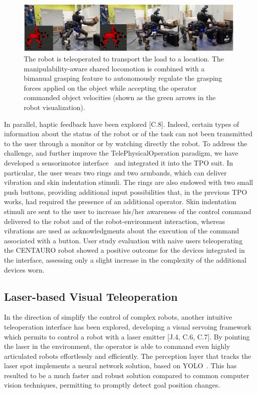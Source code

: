 \begin{figure}[H]
	\centering
	\includegraphics[width=0.9\linewidth]{img/tpoexpbox}
	\caption{The robot is teleoperated to transport the load to a location. The manipulability-aware shared locomotion is combined with a bimanual grasping feature to autonomously regulate the grasping forces applied on the object while accepting the operator commanded object velocities (shown as the green arrows in the robot visualization).}
	\label{fig:tpoexpbox}
\end{figure}

In parallel, haptic feedback have been explored [C.8]. Indeed, certain types of information about the status of the robot or of the task can not been transmitted to the user through a monitor or by watching directly the robot. To address the challenge, and further improve the TelePhysicalOperation paradigm, we have developed a sensorimotor interface~\cite{prattichizzo2021human} and integrated it into the TPO suit. In particular, the user wears two rings and two armbands, which can deliver vibration and skin indentation stimuli. 
The rings are also endowed with two small push buttons, providing additional input possibilities that, in the previous TPO works, had required the presence of an additional operator. Skin indentation stimuli are sent to the user to increase his/her awareness of the control command delivered to the robot and of the robot-environment interaction, whereas vibrations are used as acknowledgments about the execution of the command associated with a button.
User study evaluation with naive users teleoperating the CENTAURO robot showed a positive outcome for the devices integrated in the interface, assessing only a slight increase in the complexity of the additional devices worn.


\subsection{Laser-based Visual Teleoperation}
In the direction of simplify the control of complex robots, another intuitive teleoperation interface has been explored, developing a visual servoing framework which permits to control a robot with a laser emitter [J.4, C.6, C.7]. By pointing the laser in the environment, the operator is able to command even highly articulated robots effortlessly and efficiently. 
The perception layer that tracks the laser spot implements a neural network solution, based on YOLO~\cite{yolov5}. This has resulted to be a much faster and robust solution compared to common computer vision techniques, permitting to promptly detect goal position changes. 

